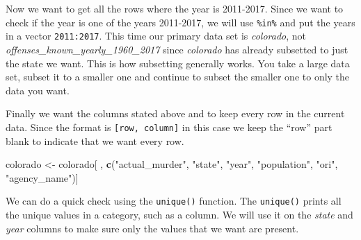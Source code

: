 \documentclass[
  12pt,
]{book}
\newenvironment{Shaded}{\begin{snugshade}}{\end{snugshade}}
\newcommand{\CommentTok}[1]{\textcolor[rgb]{0.56,0.35,0.01}{\textit{#1}}}
\newcommand{\DecValTok}[1]{\textcolor[rgb]{0.00,0.00,0.81}{#1}}
\newcommand{\KeywordTok}[1]{\textcolor[rgb]{0.13,0.29,0.53}{\textbf{#1}}}
\newcommand{\NormalTok}[1]{#1}
\newcommand{\OperatorTok}[1]{\textcolor[rgb]{0.81,0.36,0.00}{\textbf{#1}}}
\newcommand{\StringTok}[1]{\textcolor[rgb]{0.31,0.60,0.02}{#1}}
\begin{document}
Now we want to get all the rows where the year is 2011-2017. Since we want to check if the year is one of the years 2011-2017, we will use \texttt{\%in\%} and put the years in a vector \texttt{2011:2017}. This time our primary data set is \emph{colorado}, not \emph{offenses\_known\_yearly\_1960\_2017} since \emph{colorado} has already subsetted to just the state we want. This is how subsetting generally works. You take a large data set, subset it to a smaller one and continue to subset the smaller one to only the data you want.

\begin{Shaded}
\end{Shaded}

Finally we want the columns stated above and to keep every row in the current data. Since the format is \texttt{{[}row,\ column{]}} in this case we keep the ``row'' part blank to indicate that we want every row.

\begin{Shaded}
\begin{Highlighting}[]
\NormalTok{colorado <{-}}\StringTok{ }\NormalTok{colorado[ , }\KeywordTok{c}\NormalTok{(}\StringTok{"actual\_murder"}\NormalTok{, }\StringTok{"state"}\NormalTok{, }\StringTok{"year"}\NormalTok{, }\StringTok{"population"}\NormalTok{, }\StringTok{"ori"}\NormalTok{, }\StringTok{"agency\_name"}\NormalTok{)]}
\end{Highlighting}
\end{Shaded}

We can do a quick check using the \texttt{unique()} function. The \texttt{unique()} prints all the unique values in a category, such as a column. We will use it on the \emph{state} and \emph{year} columns to make sure only the values that we want are present.

\begin{Shaded}
\end{Shaded}

\begin{Shaded}
\end{Shaded}
\end{document}

